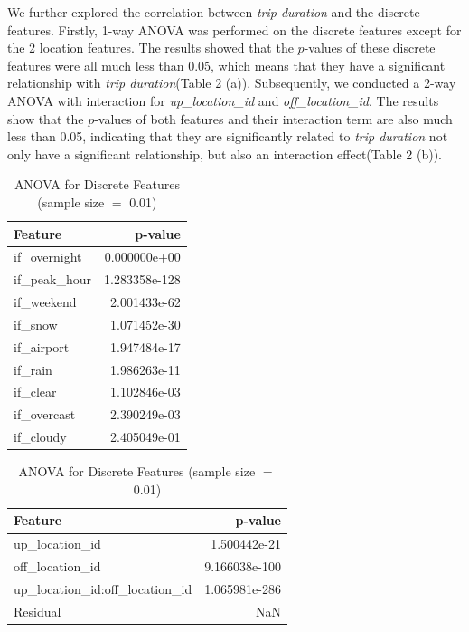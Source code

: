 \documentclass[11pt]{article}
\begin{document}
We further explored the correlation between \textit{trip duration} and the discrete features. Firstly, 1-way ANOVA was performed on the discrete features except for the 2 location features. The results showed that the $p$-values of these discrete features were all much less than 0.05, which means that they have a significant relationship with \textit{trip duration}(Table 2 (a)). Subsequently, we conducted a 2-way ANOVA with interaction for \textit{up\_location\_id} and \textit{off\_location\_id}. The results show that the $p$-values of both features and their interaction term are also much less than 0.05, indicating that they are significantly related to \textit{trip duration} not only have a significant relationship, but also an interaction effect(Table 2 (b)).

\begin{table}[h!]
    \centering

    \begin{minipage}{0.45\linewidth}
        \centering
        \begin{tabular}{lr}
            \toprule
            Feature & p-value \\
            \midrule
            if\_overnight & 0.000000e+00 \\
            if\_peak\_hour & 1.283358e-128 \\
            if\_weekend & 2.001433e-62 \\
            if\_snow & 1.071452e-30 \\
            if\_airport & 1.947484e-17 \\
            if\_rain & 1.986263e-11 \\
            if\_clear & 1.102846e-03 \\
            if\_overcast & 2.390249e-03 \\
            if\_cloudy & 2.405049e-01 \\
            \bottomrule
        \end{tabular}
    \end{minipage}
    \hfill
    \begin{minipage}{0.45\linewidth}
        \centering
        \begin{tabular}{lr}
            \toprule
            Feature & p-value \\
            \midrule
            up\_location\_id & 1.500442e-21 \\
            off\_location\_id & 9.166038e-100 \\
            up\_location\_id:off\_location\_id & 1.065981e-286 \\
            Residual & NaN \\
            \bottomrule
        \end{tabular}
    \end{minipage}
    \caption{ANOVA for Discrete Features (sample size $=$ 0.01)}
\end{table}
\end{document}
